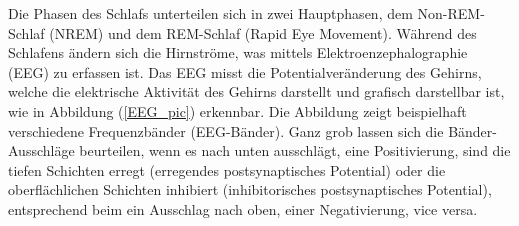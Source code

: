\documentclass[a4paper, 12pt]{article}
\begin{document}
Die Phasen des Schlafs unterteilen sich in zwei Hauptphasen, dem Non-REM-Schlaf (NREM) und dem REM-Schlaf (Rapid Eye Movement). Während des Schlafens ändern sich die Hirnströme, was mittels Elektroenzephalographie (EEG) zu erfassen ist. Das EEG misst die Potentialveränderung des Gehirns, welche die elektrische Aktivität des Gehirns darstellt und grafisch darstellbar ist, wie in Abbildung (\ref{EEG_pic}) erkennbar. Die Abbildung zeigt beispielhaft verschiedene Frequenzbänder (EEG-Bänder). Ganz grob lassen sich die Bänder-Ausschläge beurteilen, wenn es nach unten ausschlägt, eine Positivierung, sind die tiefen Schichten erregt (erregendes postsynaptisches Potential) oder die oberflächlichen Schichten inhibiert (inhibitorisches postsynaptisches Potential), entsprechend beim ein Ausschlag nach oben, einer Negativierung, vice versa.  \cite{flexikon}
\end{document}
